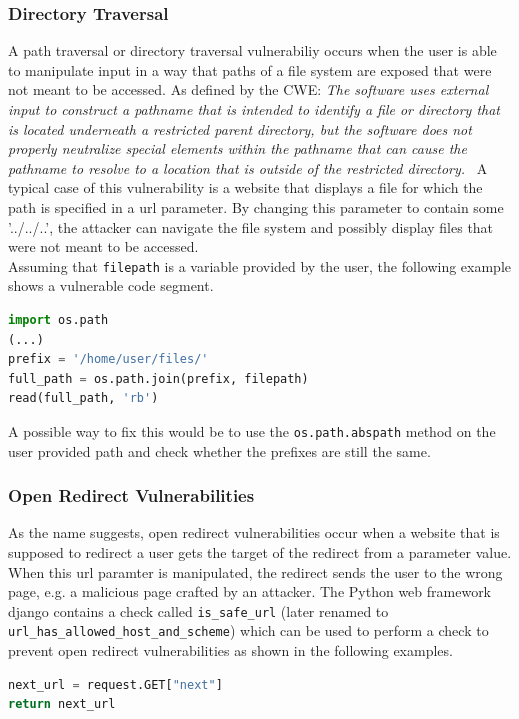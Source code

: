 \documentclass[
	a4paper,
	pagesize,
	pdftex,
	12pt,
	twoside, %
	BCOR=5mm, %
	ngerman,
	fleqn,
	final,
	]{scrartcl}
\begin{document}
\subsubsection{Directory Traversal}
A path traversal or directory traversal vulnerabiliy occurs when the user is able to manipulate input in a way that paths of a file system are exposed that were not meant to be accessed. 
As defined by the CWE: \textit{The software uses external input to construct a pathname that is intended to identify a file or directory that is located underneath a restricted parent directory, but the software does not properly neutralize special elements within the pathname that can cause the pathname to resolve to a location that is outside of the restricted directory.}~\cite{CommonWeaknessEnumeration.19.9.2019c}  A typical case of this vulnerability is a website that displays a file for which the path is specified in a url parameter. By changing this parameter to contain some '../../..', the attacker can navigate the file system and possibly display files that were not meant to be accessed.\\
Assuming that \texttt{filepath} is a variable provided by the user, the following example shows a vulnerable code segment.
\begin{lstlisting}[language=Python, showstringspaces=False]
import os.path
(...)
prefix = '/home/user/files/'
full_path = os.path.join(prefix, filepath)
read(full_path, 'rb')
\end{lstlisting}
A possible way to fix this would be to use the \texttt{os.path.abspath} method on the user provided path and check whether the prefixes are still the same. 



\subsubsection{Open Redirect Vulnerabilities}
As the name suggests, open redirect vulnerabilities occur when a website that is supposed to redirect a user gets the target of the redirect from a parameter value. When this url paramter is manipulated, the redirect sends the user to the wrong page, e.g. a malicious page crafted by an attacker. The Python web framework django contains a check called \texttt{is\_safe\_url} (later renamed to \texttt{url\_has\_allowed\_host\_and\_scheme}) which can be used to perform a check to prevent open redirect vulnerabilities as shown in the following examples.

\begin{lstlisting}[language=Python, showstringspaces=False]
next_url = request.GET["next"]
return next_url
\end{lstlisting}
\end{document}
